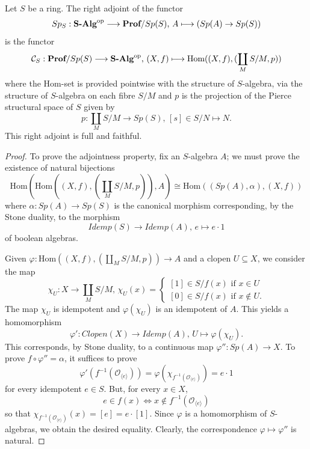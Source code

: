 \begin{theorem}
    Let $S$ be a ring. The right adjoint of the functor
    \[ Sp_S:{\textbf{S-Alg}}^{\mathrm{op}}\longrightarrow \textbf{Prof}/Sp(S)\text{, }A\longmapsto (Sp(A)\to Sp(S)) \]
    is the functor
    \[ {\mathcal{C}}_S:\textbf{Prof}/Sp(S)\longrightarrow{\textbf{S-Alg}}^{\mathrm{op}}\text{, }(X,f)\longmapsto \text{Hom}((X,f),(\coprod_M S/M, p)) \]
    where the Hom-set is provided pointwise with the structure of $S$-algebra, via the structure of $S$-algebra on each fibre $S/M$ and $p$ is the projection of the Pierce structural space of $S$ given by
    \[ p:\coprod_M S/M \longrightarrow Sp(S)\text{, }[s]\in S/N\longmapsto N. \]
    This right adjoint is full and faithful.
    \begin{proof}
        To prove the adjointness property, fix an $S$-algebra $A$; we must prove the existence of natural bijections
        \[ \text{Hom}(\text{Hom}((X,f),(\coprod_MS/M,p)),A)\cong \text{Hom}((Sp(A),\alpha),(X,f)) \]
        where $\alpha:Sp(A)\to Sp(S)$ is the canonical morphism corresponding, by the Stone duality, to the morphism
        \[ Idemp(S)\longrightarrow Idemp(A)\text{, }e\longmapsto e\cdot 1 \]
        of boolean algebras. 
        
        Given $\varphi:\text{Hom}((X,f),(\coprod_MS/M,p))\longrightarrow A$ and a clopen $U\subseteq X$, we consider the map
        \[ \chi_U:X\to \coprod_MS/M\text{, }\chi_U(x) = \begin{cases}
            [1]\in S/f(x)\text{ if }x\in U\\
            [0]\in S/f(x)\text{ if }x\not\in U.
        \end{cases} \]
        The map $\chi_U$ is idempotent and $\varphi(\chi_U)$ is an idempotent of $A$. This yields a homomorphism
        \[ \varphi':Clopen(X)\longrightarrow Idemp(A)\text{, }U\longmapsto \varphi(\chi_U). \]
        This corresponds, by Stone duality, to a continuous map $\varphi'':Sp(A)\longrightarrow X$. To prove $f\circ \varphi'' = \alpha$, it suffices to prove
        \[ \varphi'(f^{-1}(\mathcal{O}_{\langle e \rangle})) = \varphi(\chi_{f^{-1}(\mathcal{O}_{\langle e \rangle})}) = e\cdot 1 \]
        for every idempotent $e\in S$. But, for every $x\in X$,
        \[ e\in f(x) \iff x\not\in f^{-1}(\mathcal{O}_{\langle e \rangle}) \]
        so that $\chi_{f^{-1}(\mathcal{O}_{\langle e \rangle})}(x) = [e] = e\cdot [1]$. Since $\varphi$ is a homomorphism of $S$-algebras, we obtain the desired equality. Clearly, the correspondence $\varphi\longmapsto\varphi''$ is natural.
        

\end{proof}
\end{theorem}
